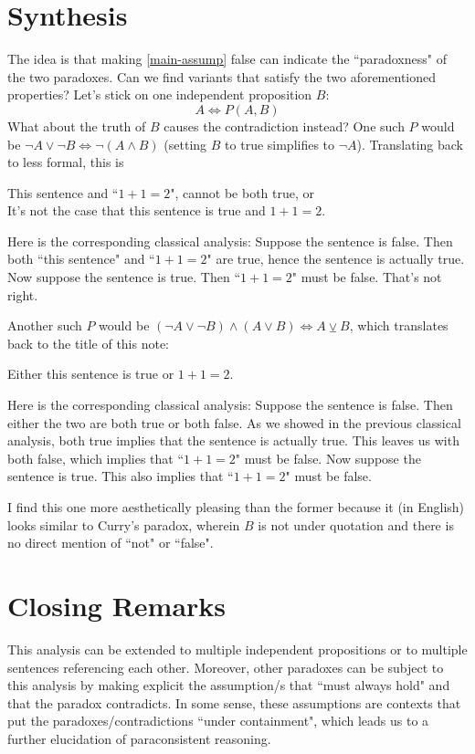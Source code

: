 \documentclass{article}
\begin{document}
\section{Synthesis}
The idea is that making \ref{main-assump} false can indicate the ``paradoxness" of the two paradoxes. Can we find variants that satisfy the two aforementioned properties? Let's stick on one independent proposition $B$:
\[A \iff P(A, B)\]
What about the truth of $B$ causes the contradiction instead? One such $P$ would be $\neg A \vee \neg B \iff \neg (A \wedge B)$ (setting $B$ to true simplifies to $\neg A$). Translating back to less formal, this is
\begin{displayquote}
This sentence and ``$1+1=2$", cannot be both true, or\\
It's not the case that this sentence is true and $1+1=2$.
\end{displayquote}
Here is the corresponding classical analysis: Suppose the sentence is false. Then both ``this sentence" and ``$1+1=2$" are true, hence the sentence is actually true. Now suppose the sentence is true. Then ``$1+1=2$" must be false. That's not right.

Another such $P$ would be $(\neg A \vee \neg B ) \wedge (A \vee B) \iff A \veebar B$, which translates back to the title of this note:
\begin{displayquote}
Either this sentence is true or $1+1=2$.
\end{displayquote}
Here is the corresponding classical analysis: Suppose the sentence is false. Then either the two are both true or both false. As we showed in the previous classical analysis, both true implies that the sentence is actually true. This leaves us with both false, which implies that ``$1+1=2$" must be false. Now suppose the sentence is true. This also implies that ``$1+1=2$" must be false.

I find this one more aesthetically pleasing than the former because it (in English) looks similar to Curry's paradox, wherein $B$ is not under quotation and there is no direct mention of ``not" or ``false".

\section{Closing Remarks}
This analysis can be extended to multiple independent propositions or to multiple sentences referencing each other. Moreover, other paradoxes can be subject to this analysis by making explicit the assumption/s that ``must always hold" and that the paradox contradicts. In some sense, these assumptions are contexts that put the paradoxes/contradictions ``under containment", which leads us to a further elucidation of paraconsistent reasoning.



\end{document}
